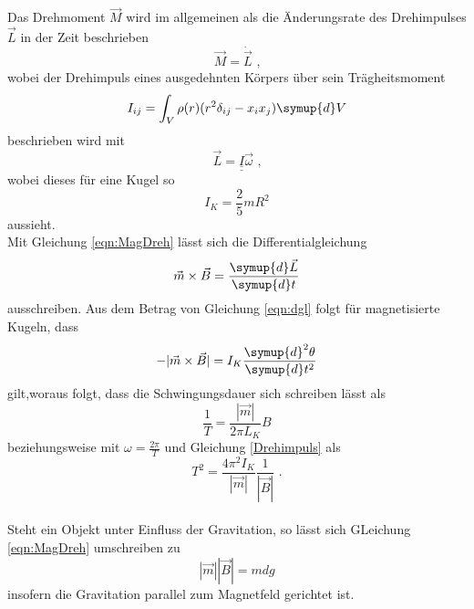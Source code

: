 \noindent Das Drehmoment $\vec{M}$ wird im allgemeinen als die Änderungsrate des Drehimpulses $\vec{L}$ in der Zeit beschrieben
\begin{equation}
    \vec{M}=\dot{\vec{L}}\text{ ,}
\end{equation}
wobei der Drehimpuls eines ausgedehnten Körpers über sein Trägheitsmoment 
\begin{equation}
    I_{ij}=\int_V\rho(r)(r^2\delta_{ij}-x_ix_j)\symup{d}V
\end{equation}
beschrieben wird mit 
\begin{equation}
    \vec{L}=\underline{\underline{I}}\vec{\omega}\text{ ,}
    \label{eqn:Drehimpuls}
\end{equation}
wobei dieses für eine Kugel so
\begin{equation}
    I_K=\frac{2}{5}mR^2
    \label{eqn:trägheit_kugel}
\end{equation}
aussieht. \\

\noindent Mit Gleichung \ref{eqn:MagDreh} lässt sich die Differentialgleichung
\begin{equation}
    \vec{m}\times\vec{B}=\frac{\symup{d}\vec{L}}{\symup{d}t}
    \label{eqn:dgl}
\end{equation}
ausschreiben.
Aus dem Betrag von Gleichung \ref{eqn:dgl} folgt für magnetisierte Kugeln, dass
\begin{equation}
    -|\vec{m}\times\vec{B}|=I_K\frac{\symup{d}^2\theta}{\symup{d}t^2}
    \label{eqn:dglmagmom}
\end{equation}
gilt,woraus folgt, dass die Schwingungsdauer sich schreiben lässt als
\begin{equation}
    \frac{1}{T}=\frac{|\vec{m}|}{2\pi L_K}B
    \label{eqn:schwingdauer1}
\end{equation}
beziehungsweise mit $\omega=\frac{2\pi}{T}$ und Gleichung \ref{Drehimpuls} als
\begin{equation}
    T^2=\frac{4\pi^2I_K}{|\vec{m}|}\frac{1}{|\vec{B}|}\text{ .}
    \label{eqn:schwingdauer2}
\end{equation}\\

Steht ein Objekt unter Einfluss der Gravitation, so lässt sich GLeichung \ref{eqn:MagDreh} umschreiben zu
\begin{equation}
    |\vec{m}||\vec{B}|=mdg
    \label{eqn:dreh_grav}
\end{equation}
insofern die Gravitation parallel zum Magnetfeld gerichtet ist.

